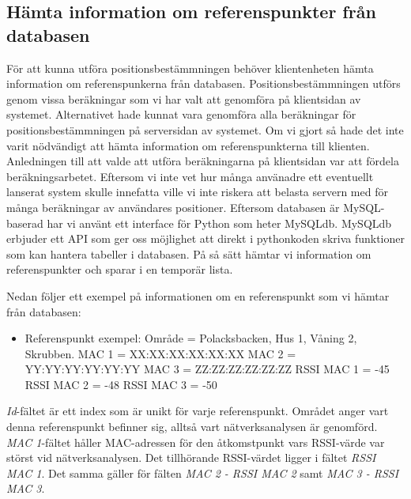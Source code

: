 \documentclass[swedish, a4paper,12pt]{article}
\begin{document}
\subsection{Hämta information om referenspunkter från databasen}\label{HamtaInfoDB}
För att kunna utföra positionsbestämmningen behöver klientenheten hämta information om referenspunkerna från databasen. Positionsbestämmningen utförs genom vissa beräkningar som vi har valt att genomföra på klientsidan av systemet. Alternativet hade kunnat vara genomföra alla beräkningar för positionsbestämmningen på serversidan av systemet. Om vi gjort så hade det inte varit nödvändigt att hämta information om referenspunkterna till klienten. Anledningen till att valde att utföra beräkningarna på klientsidan var att fördela beräkningsarbetet. Eftersom vi inte vet hur många använadre ett eventuellt lanserat system skulle innefatta ville vi inte riskera att belasta servern med för många beräkningar av användares positioner. Eftersom databasen är MySQL-baserad har vi använt ett interface för Python som heter MySQLdb\cite{mysqldb}. MySQLdb erbjuder ett API som ger oss möjlighet att direkt i pythonkoden skriva funktioner som kan hantera tabeller i databasen. På så sätt hämtar vi information om referenspunkter och sparar i en temporär lista.

Nedan följer ett exempel på informationen om en referenspunkt som vi hämtar från databasen:
\begin{itemize}
  \item Referenspunkt exempel:
        \newline Område = Polacksbacken, Hus 1, Våning 2, Skrubben.
        \newline MAC 1 = XX:XX:XX:XX:XX:XX
        \newline MAC 2 = YY:YY:YY:YY:YY:YY
        \newline MAC 3 = ZZ:ZZ:ZZ:ZZ:ZZ:ZZ
        \newline RSSI MAC 1 = -45
        \newline RSSI MAC 2 = -48
        \newline RSSI MAC 3 = -50
\end{itemize}

\textit{Id}-fältet är ett index som är unikt för varje referenspunkt. Området anger vart denna referenspunkt befinner sig, alltså vart nätverksanalysen är genomförd. \textit{MAC 1}-fältet håller MAC-adressen för den åtkomstpunkt vars RSSI-värde var störst vid nätverksanalysen. Det tillhörande RSSI-värdet ligger i fältet \textit{RSSI MAC 1}.
Det samma gäller för fälten \textit{MAC 2 - RSSI MAC 2} samt \textit{MAC 3 - RSSI MAC 3}.
\end{document}
